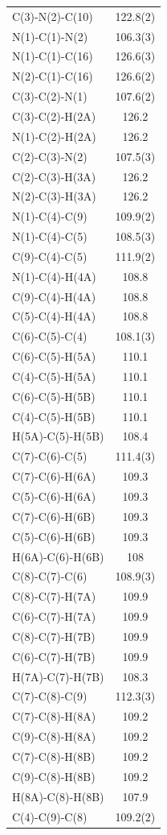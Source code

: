 \begin{center}
{\begin{supertabular}{p{1.5in}c}
C(3)-N(2)-C(10)&122.8(2)\\
N(1)-C(1)-N(2)&106.3(3)\\
N(1)-C(1)-C(16)&126.6(3)\\
N(2)-C(1)-C(16)&126.6(2)\\
C(3)-C(2)-N(1)&107.6(2)\\
C(3)-C(2)-H(2A)&126.2\\
N(1)-C(2)-H(2A)&126.2\\
C(2)-C(3)-N(2)&107.5(3)\\
C(2)-C(3)-H(3A)&126.2\\
N(2)-C(3)-H(3A)&126.2\\
N(1)-C(4)-C(9)&109.9(2)\\
N(1)-C(4)-C(5)&108.5(3)\\
C(9)-C(4)-C(5)&111.9(2)\\
N(1)-C(4)-H(4A)&108.8\\
C(9)-C(4)-H(4A)&108.8\\
C(5)-C(4)-H(4A)&108.8\\
C(6)-C(5)-C(4)&108.1(3)\\
C(6)-C(5)-H(5A)&110.1\\
C(4)-C(5)-H(5A)&110.1\\
C(6)-C(5)-H(5B)&110.1\\
C(4)-C(5)-H(5B)&110.1\\
H(5A)-C(5)-H(5B)&108.4\\
C(7)-C(6)-C(5)&111.4(3)\\
C(7)-C(6)-H(6A)&109.3\\
C(5)-C(6)-H(6A)&109.3\\
C(7)-C(6)-H(6B)&109.3\\
C(5)-C(6)-H(6B)&109.3\\
H(6A)-C(6)-H(6B)&108\\
C(8)-C(7)-C(6)&108.9(3)\\
C(8)-C(7)-H(7A)&109.9\\
C(6)-C(7)-H(7A)&109.9\\
C(8)-C(7)-H(7B)&109.9\\
C(6)-C(7)-H(7B)&109.9\\
H(7A)-C(7)-H(7B)&108.3\\
C(7)-C(8)-C(9)&112.3(3)\\
C(7)-C(8)-H(8A)&109.2\\
C(9)-C(8)-H(8A)&109.2\\
C(7)-C(8)-H(8B)&109.2\\
C(9)-C(8)-H(8B)&109.2\\
H(8A)-C(8)-H(8B)&107.9\\
C(4)-C(9)-C(8)&109.2(2)\\

\end{supertabular}}
\end{center}
